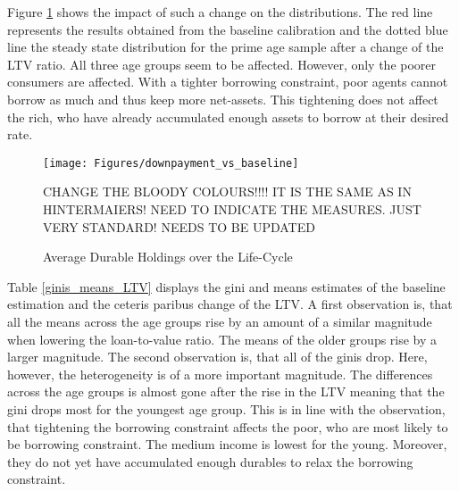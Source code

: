 \documentclass[a4paper,12pt,legno]{article}
\begin{document}
Figure \ref{downpayment_vs_baseline} shows the impact of such a change on the distributions. The red line represents the results obtained from the baseline calibration and the dotted blue line the steady state distribution for the prime age sample after a change of the LTV ratio. All three age groups seem to be affected. However, only the poorer consumers are affected. With a tighter borrowing constraint, poor agents cannot borrow as much and thus keep more net-assets. This tightening does not affect the rich, who have already accumulated enough assets to borrow at their desired rate. 

\begin{figure}[!htbp]
\caption{Average Durable Holdings over the Life-Cycle} 
\label{downpayment_vs_baseline}	%
\centering
\texttt{[image: Figures/downpayment\_vs\_baseline]}  %

\begin{minipage}{0.8\linewidth}
\footnotesize{CHANGE THE BLOODY COLOURS!!!! IT IS THE SAME AS IN HINTERMAIERS! NEED TO INDICATE THE MEASURES. JUST VERY STANDARD! NEEDS TO BE UPDATED}
\end{minipage}

\end{figure}

Table \ref{ginis_means_LTV} displays the gini and means estimates of the baseline estimation and the ceteris paribus change of the LTV. A first observation is, that all the means across the age groups rise by an amount of a similar magnitude when lowering the loan-to-value ratio. The means of the older groups rise by a larger magnitude. The second observation is, that all of the ginis drop. Here, however, the heterogeneity is of a more important magnitude. The differences across the age groups is almost gone after the rise in the LTV meaning that the gini drops most for the youngest age group. This is in line with the observation, that tightening the borrowing constraint affects the poor, who are most likely to be borrowing constraint. The medium income is lowest for the young. Moreover, they do not yet have accumulated enough durables to relax the borrowing constraint. 
\end{document}
